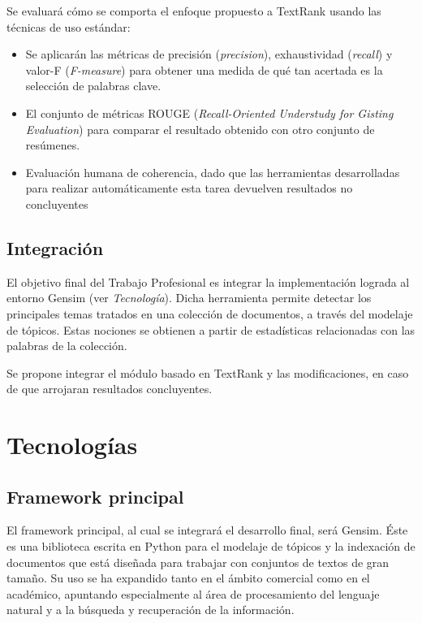 \documentclass[12pt,a4paper]{article}
\begin{document}
Se evaluará cómo se comporta el enfoque propuesto a TextRank usando las técnicas 
de uso estándar:
\begin{itemize}
    \item Se aplicarán las métricas de precisión (\textit{precision}), exhaustividad 
(\textit{recall}) y valor-F (\textit{F-measure}) para obtener una medida de qué tan acertada es la 
selección de palabras clave.
    \item El conjunto de métricas ROUGE (\textit{Recall-Oriented Understudy for Gisting 
Evaluation}) 
para comparar el resultado obtenido con otro conjunto de 
resúmenes.
    \item Evaluación humana de coherencia, dado que las herramientas desarrolladas para realizar automáticamente esta tarea devuelven resultados no concluyentes
\end{itemize}

\subsection{Integración}

El objetivo final del Trabajo Profesional es integrar la implementación lograda al entorno Gensim (ver \emph{Tecnología}). Dicha herramienta permite detectar los principales temas tratados en una colección de documentos, a través del modelaje de tópicos. Estas nociones se obtienen a partir de estadísticas relacionadas con las palabras de la colección.

Se propone integrar el módulo basado en TextRank y las modificaciones, en caso de que arrojaran resultados concluyentes.


\section{Tecnologías}

\subsection{Framework principal}

El framework principal, al cual se integrará el desarrollo final, será Gensim.\cite{gensim} Éste es una biblioteca escrita en Python para el modelaje de tópicos y la indexación de documentos que está diseñada para trabajar con conjuntos de textos de gran tamaño. Su uso se ha expandido tanto en el ámbito comercial como en el académico, apuntando especialmente al área de procesamiento del lenguaje natural y a la búsqueda y recuperación de la información. 
\end{document}

